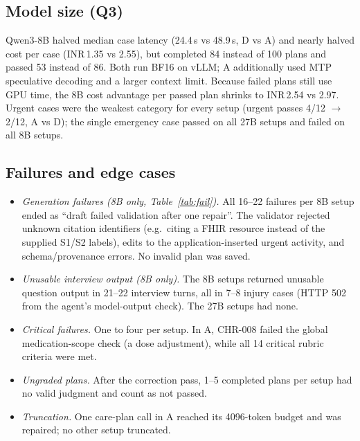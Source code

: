 \documentclass[conference]{IEEEtran}
\begin{document}
\subsection{Model size (Q3)}
Qwen3-8B halved median case latency (24.4\,s vs 48.9\,s, D vs A) and nearly halved cost per case (INR\,1.35 vs 2.55), but completed 84 instead of 100 plans and passed 53 instead of 86. Both run BF16 on vLLM; A additionally used MTP speculative decoding and a larger context limit. Because failed plans still use GPU time, the 8B cost advantage per passed plan shrinks to INR\,2.54 vs 2.97. Urgent cases were the weakest category for every setup (urgent passes 4/12 $\rightarrow$ 2/12, A vs D); the single emergency case passed on all 27B setups and failed on all 8B setups.

\subsection{Failures and edge cases}
\begin{itemize}
\item \emph{Generation failures (8B only, Table~\ref{tab:fail}).} All 16--22 failures per 8B setup ended as ``draft failed validation after one repair''. The validator rejected unknown citation identifiers (e.g.\ citing a FHIR resource instead of the supplied S1/S2 labels), edits to the application-inserted urgent activity, and schema/provenance errors. No invalid plan was saved.
\item \emph{Unusable interview output (8B only).} The 8B setups returned unusable question output in 21--22 interview turns, all in 7--8 injury cases (HTTP 502 from the agent's model-output check). The 27B setups had none.
\item \emph{Critical failures.} One to four per setup. In A, CHR-008 failed the global medication-scope check (a dose adjustment), while all 14 critical rubric criteria were met.
\item \emph{Ungraded plans.} After the correction pass, 1--5 completed plans per setup had no valid judgment and count as not passed.
\item \emph{Truncation.} One care-plan call in A reached its 4096-token budget and was repaired; no other setup truncated.
\end{itemize}

\begin{table}[t]
\caption{Qwen3-8B failure analysis (27B setups had no failures)}
\label{tab:fail}
\centering\scriptsize

\end{table}
\end{document}
